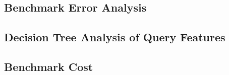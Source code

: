 



\subsection{Benchmark Error Analysis}
\label{subsec:erroranalysis}



\subsection{Decision Tree Analysis of Query Features}
\label{subsec:dtrees}




\subsection{Benchmark Cost}
\label{sec:bmcost}






